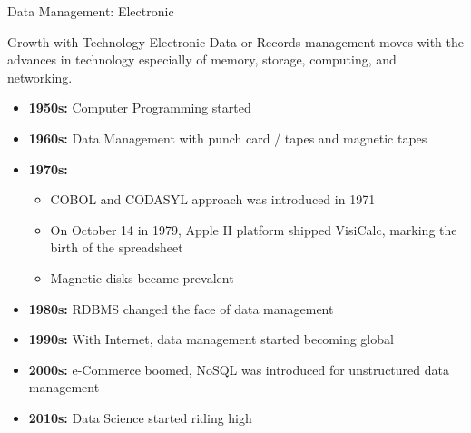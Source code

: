 \documentclass[aspectratio=169, xcolor=dvipsnames]{beamer}
\begin{document}
\begin{frame}{Data Management: Electronic}
    \begin{exampleblock}{Growth with Technology}
        Electronic Data or Records management moves with the advances in technology especially of memory, storage, computing, and networking.
    \end{exampleblock}
    \begin{itemize}[<+->]
        \item \textbf{1950s:} Computer Programming started
        \item \textbf{1960s:} Data Management with punch card / tapes and magnetic tapes
        \item \textbf{1970s:} 
        \begin{itemize}
            \item COBOL and CODASYL approach was introduced in 1971
            \item On October 14 in 1979, Apple II platform shipped VisiCalc, marking the birth of the spreadsheet
            \item Magnetic disks became prevalent
        \end{itemize}
        \item \textbf{1980s:} RDBMS changed the face of data management
        \item \textbf{1990s:} With Internet, data management started becoming global
        \item \textbf{2000s:} e-Commerce boomed, NoSQL was introduced for unstructured data management
        \item \textbf{2010s:} Data Science started riding high
    \end{itemize}
\end{frame}
\end{document}
